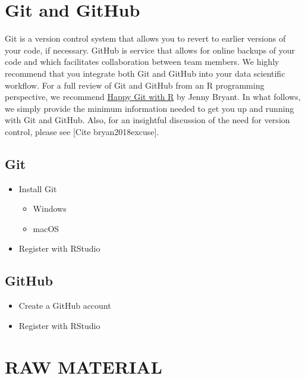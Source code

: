 \documentclass[
]{book}
\providecommand{\tightlist}{%
  \setlength{\itemsep}{0pt}\setlength{\parskip}{0pt}}
\begin{document}
\hypertarget{git-and-github}{%
\section{Git and GitHub}\label{git-and-github}}

Git is a version control system that allows you to revert to earlier versions of your code, if necessary. GitHub is service that allows for online backups of your code and which facilitates collaboration between team members. We highly recommend that you integrate both Git and GitHub into your data scientific workflow. For a full review of Git and GitHub from an R programming perspective, we recommend \href{https://happygitwithr.com/}{Happy Git with R} by Jenny Bryant. In what follows, we simply provide the minimum information needed to get you up and running with Git and GitHub. Also, for an insightful discussion of the need for version control, please see {[}Cite bryan2018excuse{]}.

\hypertarget{git}{%
\subsection{Git}\label{git}}

\begin{itemize}
\tightlist
\item
  Install Git

  \begin{itemize}
  \tightlist
  \item
    Windows
  \item
    macOS
  \end{itemize}
\item
  Register with RStudio
\end{itemize}

\hypertarget{github}{%
\subsection{GitHub}\label{github}}

\begin{itemize}
\tightlist
\item
  Create a GitHub account
\item
  Register with RStudio
\end{itemize}

\hypertarget{raw-material}{%
\section{RAW MATERIAL}\label{raw-material}}
\end{document}
